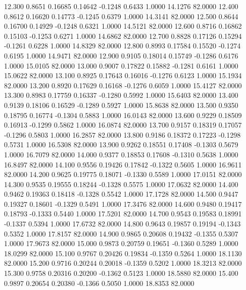   12.300   0.8651   0.16685   0.14642  -0.1248   0.6433   1.0000  14.1276  82.0000
  12.400   0.8612   0.16620   0.14773  -0.1245   0.6379   1.0000  14.3141  82.0000
  12.500   0.8644   0.16700   0.14929  -0.1248   0.6321   1.0000  14.5121  82.0000
  12.600   0.8716   0.16862   0.15103  -0.1253   0.6271   1.0000  14.6862  82.0000
  12.700   0.8828   0.17126   0.15294  -0.1261   0.6228   1.0000  14.8329  82.0000
  12.800   0.8993   0.17584   0.15520  -0.1274   0.6195   1.0000  14.9471  82.0000
  12.900   0.9105   0.18014   0.15749  -0.1286   0.6176   1.0000  15.0105  82.0000
  13.000   0.9007   0.17822   0.15882  -0.1281   0.6161   1.0000  15.0622  82.0000
  13.100   0.8925   0.17643   0.16016  -0.1276   0.6123   1.0000  15.1934  82.0000
  13.200   0.8920   0.17629   0.16168  -0.1276   0.6059   1.0000  15.4127  82.0000
  13.300   0.8983   0.17759   0.16337  -0.1280   0.5992   1.0000  15.6403  82.0000
  13.400   0.9139   0.18106   0.16529  -0.1289   0.5927   1.0000  15.8638  82.0000
  13.500   0.9350   0.18795   0.16774  -0.1304   0.5883   1.0000  16.0143  82.0000
  13.600   0.9229   0.18509   0.16913  -0.1299   0.5862   1.0000  16.0874  82.0000
  13.700   0.9157   0.18319   0.17057  -0.1296   0.5803   1.0000  16.2857  82.0000
  13.800   0.9186   0.18372   0.17223  -0.1298   0.5731   1.0000  16.5308  82.0000
  13.900   0.9262   0.18551   0.17408  -0.1303   0.5679   1.0000  16.7079  82.0000
  14.000   0.9377   0.18853   0.17608  -0.1310   0.5638   1.0000  16.8497  82.0000
  14.100   0.9556   0.19426   0.17842  -0.1322   0.5605   1.0000  16.9611  82.0000
  14.200   0.9625   0.19775   0.18071  -0.1330   0.5589   1.0000  17.0151  82.0000
  14.300   0.9535   0.19555   0.18244  -0.1328   0.5575   1.0000  17.0632  82.0000
  14.400   0.9462   0.19363   0.18418  -0.1328   0.5542   1.0000  17.1728  82.0000
  14.500   0.9447   0.19327   0.18601  -0.1329   0.5491   1.0000  17.3476  82.0000
  14.600   0.9480   0.19417   0.18793  -0.1333   0.5440   1.0000  17.5201  82.0000
  14.700   0.9543   0.19583   0.18991  -0.1337   0.5394   1.0000  17.6732  82.0000
  14.800   0.9643   0.19857   0.19194  -0.1343   0.5352   1.0000  17.8157  82.0000
  14.900   0.9865   0.20608   0.19432  -0.1355   0.5307   1.0000  17.9673  82.0000
  15.000   0.9873   0.20759   0.19651  -0.1360   0.5289   1.0000  18.0299  82.0000
  15.100   0.9767   0.20426   0.19834  -0.1359   0.5264   1.0000  18.1130  82.0000
  15.200   0.9716   0.20244   0.20018  -0.1359   0.5202   1.0000  18.3213  82.0000
  15.300   0.9758   0.20316   0.20200  -0.1362   0.5123   1.0000  18.5880  82.0000
  15.400   0.9897   0.20654   0.20380  -0.1366   0.5050   1.0000  18.8353  82.0000
